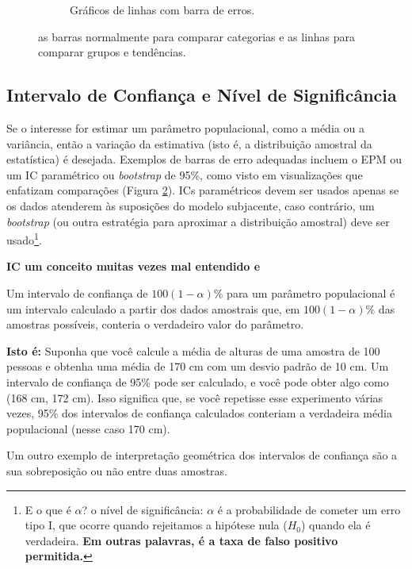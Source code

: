 \documentclass[article]{memoir}
\begin{document}
\begin{figure}[ht]
\begin{minipage}{0.7\textwidth}
\begin{subfigure}[b]{0.45\textwidth}
			\caption{Gráficos de linhas com barra de erros.}
			\label{fig:sub2}
		\end{subfigure}
	\end{minipage}
	\caption{as barras normalmente para comparar categorias e as linhas para comparar grupos e tendências.}
	\label{fig:ex_bar_lines}
\end{figure}
\subsection{Intervalo de Confiança e Nível de Significância}
Se o interesse for estimar um parâmetro populacional, como a média ou a variância, então a variação da estimativa (isto é, a distribuição amostral da estatística) é desejada. Exemplos de barras de erro adequadas incluem o EPM ou um IC paramétrico ou \textit{bootstrap} de 95\%, como visto em visualizações que enfatizam comparações (Figura	\ref{fig:ex_bar_lines}). ICs paramétricos devem ser usados apenas se os dados atenderem às suposições do modelo subjacente, caso contrário, um \textit{bootstrap} (ou outra estratégia para aproximar a distribuição amostral) deve ser usado\footnote{E o que é $\alpha$? o nível de significância: 
	$\alpha$ é a probabilidade de cometer um erro tipo I, que ocorre quando rejeitamos a hipótese nula ($H_0$)
	 quando ela é verdadeira. \textbf{Em outras palavras, é a taxa de falso positivo permitida.}}. 

\begin{tcolorbox}
	\textbf{IC um conceito muitas vezes mal entendido \cite{belia2005} e \cite{hoekstra2014}}
	
	Um intervalo de confiança de $100(1 − \alpha)\%$  para um parâmetro populacional é um intervalo calculado a partir dos dados amostrais que, em $100(1 − \alpha)\%$ das amostras possíveis, conteria o verdadeiro valor do parâmetro.
	
	\textbf{Isto é:} Suponha que você calcule a média de alturas de uma amostra de 100 pessoas e obtenha uma média de 170 cm com um desvio padrão de 10 cm. Um intervalo de confiança de 95\% pode ser calculado, e você pode obter algo como (168 cm, 172 cm). Isso significa que, se você repetisse esse experimento várias vezes, 95\% dos intervalos de confiança calculados conteriam a verdadeira média populacional (nesse caso 170 cm).
	
\end{tcolorbox} 

Um outro exemplo de interpretação geométrica dos intervalos de confiança são a sua sobreposição ou não entre duas amostras.
\end{document}
